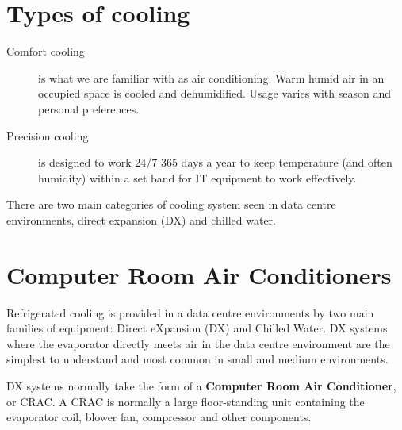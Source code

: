 \documentclass{pgnotes}
\begin{document}
\section{Types of cooling}

\begin{description}
\item[Comfort cooling] is what we are familiar with as air conditioning. Warm humid air in an occupied space is cooled and dehumidified. Usage varies with season and personal preferences.
\item[Precision cooling] is designed to work 24/7 365 days a year to keep temperature (and often humidity) within a set band for IT equipment to work effectively. 
\end{description}

There are two main categories of cooling system seen in data centre environments, direct expansion (DX) and chilled water.

\newpage

\section{Computer Room Air Conditioners}

Refrigerated cooling is provided in a data centre environments by two main families of equipment: Direct eXpansion (DX) and Chilled Water.
DX systems where the evaporator directly meets air in the data centre environment are the simplest to understand and most common in small and medium environments.

DX systems normally take the form of a \textbf{Computer Room Air Conditioner}, or CRAC.
A CRAC is normally a large floor-standing unit containing the evaporator coil, blower fan, compressor and other components.

\end{document}
